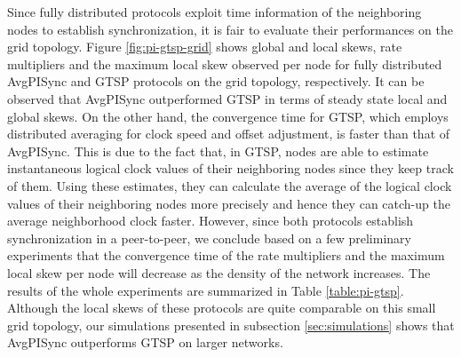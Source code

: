 \documentclass[english,a4paper,10pt,final]{article}
\numberwithin{equation}{section}
\numberwithin{figure}{section}
\begin{document}
\begin{figure*}

\center





\caption{\label{fig:pi-gtsp-grid} Global skew, local skew, rate multipliers and maximum local skew per node on the {\bf grid topology} for \textbf{AvgPISync} (left column) and \textbf{GTSP} (right column), respectively.}
\end{figure*}

Since fully distributed protocols exploit time information of the neighboring nodes to establish synchronization, it is fair to evaluate their performances on the grid topology. Figure \ref{fig:pi-gtsp-grid} shows global and local skews, rate multipliers and the maximum local skew observed per node for fully distributed AvgPISync and GTSP protocols on the grid topology, respectively. It can be observed that AvgPISync outperformed GTSP in terms of steady state local and global skews. On the other hand, the convergence time for GTSP, which employs distributed averaging for clock speed and offset adjustment, is faster than that of AvgPISync. This is due to the fact that, in GTSP, nodes are able to estimate instantaneous logical clock values of their neighboring nodes since they keep track of them. Using these estimates, they can calculate the average of the logical clock values of their neighboring nodes more precisely and hence they can catch-up the average neighborhood clock faster. However, since both protocols establish synchronization in a peer-to-peer, we conclude based on a few preliminary experiments that the convergence time of the rate multipliers and the maximum local skew per node will decrease as the density of the network increases. The results of the whole experiments are summarized in Table \ref{table:pi-gtsp}. Although the local skews of these protocols are quite comparable on this small grid topology, our simulations presented in subsection \ref{sec:simulations} shows that AvgPISync outperforms GTSP on larger networks.
\end{document}
